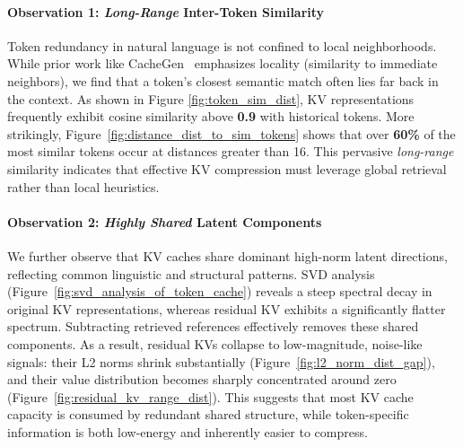 \paragraph{Observation 1: \emph{Long-Range} Inter-Token Similarity}
Token redundancy in natural language is not confined to local neighborhoods. 
While prior work like CacheGen~\cite{liu2024cachegen} emphasizes locality (similarity to immediate neighbors), we find that a token’s closest semantic match often lies far back in the context.
As shown in Figure \ref{fig:token_sim_dist}, KV representations frequently exhibit cosine similarity above \textbf{0.9} with historical tokens. 
More strikingly, Figure~\ref{fig:distance_dist_to_sim_tokens} shows that over \textbf{60\%} of the most similar tokens occur at distances greater than 16.
This pervasive \emph{long-range} similarity indicates that effective KV compression must leverage global retrieval rather than local heuristics.

\paragraph{Observation 2: \emph{Highly Shared} Latent Components}
We further observe that KV caches share dominant high-norm latent directions, reflecting common linguistic and structural patterns.
SVD analysis (Figure~\ref{fig:svd_analysis_of_token_cache}) reveals a steep spectral decay in original KV representations, whereas residual KV exhibits a significantly flatter spectrum.
Subtracting retrieved references effectively removes these shared components. As a result, residual KVs collapse to low-magnitude, noise-like signals: their L2 norms shrink substantially (Figure~\ref{fig:l2_norm_dist_gap}), and their value distribution becomes sharply concentrated around zero (Figure~\ref{fig:residual_kv_range_dist}).
This suggests that most KV cache capacity is consumed by redundant shared structure, while token-specific information is both low-energy and inherently easier to compress.
